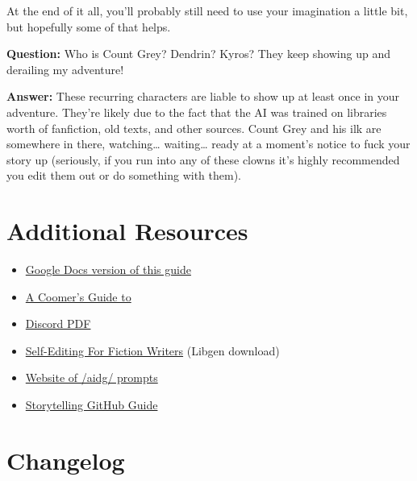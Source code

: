 \documentclass[Avsfag-main.tex]{subfiles}
\begin{document}
At the end of it all, you'll probably still need to use your imagination
a little bit, but hopefully some of that helps.\smallskip

\textbf{Question:} Who is Count Grey? Dendrin? Kyros? They keep showing
up and derailing my adventure!

\textbf{Answer:} These recurring characters are liable to show up at
least once in your adventure. They're likely due to the fact that the AI
was trained on libraries worth of fanfiction, old texts, and other
sources. Count Grey and his ilk are somewhere in there, watching…
waiting… ready at a moment's notice to fuck your story up
(seriously, if you run into any of these clowns it's highly recommended
you edit them out or do something with them).

\chapter{Additional Resources}
\label{ch:resources}

\begin{itemize}
\item
  \href{https://docs.google.com/document/d/1wSz3xlWlqMLFKrLkrO4dNWNZT1vxtrLmq2yGPJj2f4M/edit?usp=sharing}{Google Docs version of this guide}
\item
  \href{https://guide.aidg.club/}{A Coomer's Guide to \aid}
\item
  \href{https://imgur.com/a/mvjk4al}{Discord PDF}
\item
  \href{https://libgen.is/book/index.php?md5=378DC2ACDDFA931EAD042ABAD32943C4}{Self-Editing
  For Fiction Writers} (Libgen download)
\item
  \href{https://prompts.aidg.club/}{Website of /aidg/ prompts}
\item
  \href{https://github.com/FailedSave/storytelling-guide/blob/master/Guide.md}{Storytelling
  GitHub Guide}
\end{itemize}

\chapter{Changelog}
\end{document}

